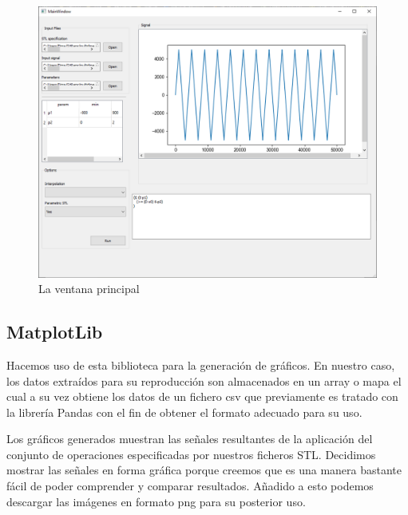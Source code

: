 \begin{figure}[htb]
\centering
  \includegraphics[width=1.0\linewidth]{images/gui} 
\caption{La ventana principal}
\label{fig:gui}
\end{figure}

 
 
 
 
\subsection{MatplotLib}
Hacemos uso de esta biblioteca para la generación de gráficos. En nuestro caso, los datos extraídos para su reproducción son almacenados en un array o mapa el cual a su vez obtiene los datos de un fichero csv que previamente es tratado con la librería Pandas con el fin de obtener el formato adecuado para su uso. 

Los gráficos generados muestran las señales resultantes de la aplicación del conjunto de operaciones especificadas por nuestros ficheros STL.
Decidimos mostrar las señales en forma gráfica porque creemos que es una manera bastante fácil de poder comprender y comparar resultados. Añadido a esto podemos descargar las imágenes en formato png para su posterior uso. 
 
